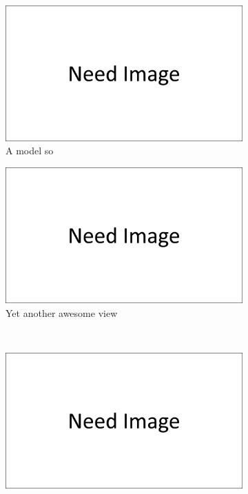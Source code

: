 \begin{figure}
    \centering
    \begin{subfigure}[b]{0.45\textwidth}
        \centering
        \includegraphics[width=\textwidth]{images/need_image.png}
        \caption{A model so}
        \label{fig:simple_medium_fea_model}
    \end{subfigure}
    \hfill
    \begin{subfigure}[b]{0.45\textwidth}
        \centering
        \includegraphics[width=\textwidth]{images/need_image.png}
        \caption{Yet another awesome view}
        \label{fig:simple_medium_with_cell_fea_model}
    \end{subfigure}
    \\
    \begin{subfigure}[b]{0.45\textwidth}
        \centering
        \includegraphics[width=\textwidth]{images/need_image.png}

\end{subfigure}
\end{figure}
